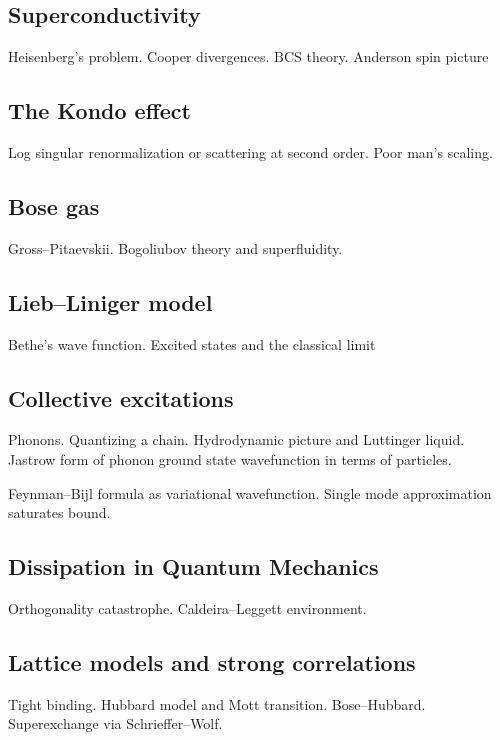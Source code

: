 \subsection{Superconductivity}

Heisenberg's problem. Cooper divergences. BCS theory. Anderson spin picture

\subsection{The Kondo effect}

Log singular renormalization or scattering at second order. Poor man's scaling.

\subsection{Bose gas}

Gross--Pitaevskii. Bogoliubov theory and superfluidity.

\subsection{Lieb--Liniger model}

Bethe's wave function. Excited states and the classical limit

\subsection{Collective excitations}

Phonons. Quantizing a chain. Hydrodynamic picture and Luttinger liquid. Jastrow form of phonon ground state wavefunction in terms of particles.

Feynman–Bijl formula as variational wavefunction. Single mode approximation saturates bound.

\subsection{Dissipation in Quantum Mechanics}

Orthogonality catastrophe. Caldeira--Leggett environment.

\subsection{Lattice models and strong correlations}

Tight binding. Hubbard model and Mott transition. Bose--Hubbard. Superexchange via Schrieffer--Wolf.

